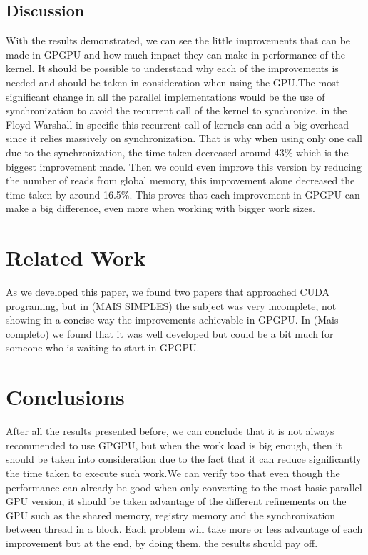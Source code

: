 \documentclass[conference]{IEEEtran}
\begin{document}
\subsection{Discussion}

With the results demonstrated, we can see the little improvements that can be made in GPGPU and how much impact they can make in performance of the kernel. It should be possible to understand why each of the improvements is needed and should be taken in consideration when using the GPU.The most significant change in all the parallel implementations would be the use of synchronization to avoid the recurrent call of the kernel to synchronize, in the Floyd Warshall in specific this recurrent call of kernels can add a big overhead since it relies massively on synchronization. That is why when using only one call due to the synchronization, the time taken decreased around 43\% which is the biggest improvement made. Then we could even improve this version by reducing the number of reads from global memory, this improvement alone decreased the time taken by around 16.5\%. This proves that each improvement in GPGPU can make a big difference, even more when working with bigger work sizes.

\section{Related Work}

As we developed this paper, we found two papers that approached CUDA programing, but in (MAIS SIMPLES) the subject was very incomplete, not showing in a concise way the improvements achievable in GPGPU. In (Mais completo) we found that it was well developed but could be a bit much for someone who is waiting to start in GPGPU.

\section{Conclusions}

After all the results presented before, we can conclude that it is not always recommended to use GPGPU, but when the work load is big enough, then it should be taken into consideration due to the fact that it can reduce significantly the time taken to execute such work.We can verify too that even though the performance can already be good when only converting to the most basic parallel GPU version, it should be taken advantage of the different refinements on the GPU such as the shared memory, registry memory and the synchronization between thread in a block. Each problem will take more or less advantage of each improvement but at the end, by doing them, the results should pay off.
\end{document}
